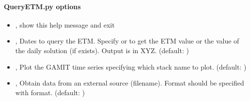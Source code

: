 \documentclass[letterpaper,10pt,english]{sphinxmanual}
\begin{document}
\paragraph{QueryETM.py options}
\label{\detokenize{com:QueryETM.py-options}}\begin{itemize}
\item {} 
\sphinxAtStartPar
{\hyperref[\detokenize{com:QueryETM.py--h}]{}}, {\hyperref[\detokenize{com:QueryETM.py---help}]{}} \sphinxhyphen{} show this help message and exit

\item {} 
\sphinxAtStartPar
{\hyperref[\detokenize{com:QueryETM.py--q}]{}} , {\hyperref[\detokenize{com:QueryETM.py---query}]{}}  \sphinxhyphen{} Dates to query the ETM. Specify  or  to get the ETM value or the value of the daily solution (if exists). Output is in XYZ. (default: )

\item {} 
\sphinxAtStartPar
{\hyperref[\detokenize{com:QueryETM.py--gamit}]{}} , {\hyperref[\detokenize{com:QueryETM.py---gamit}]{}}  \sphinxhyphen{} Plot the GAMIT time series specifying which stack name to plot. (default: )

\item {} 
\sphinxAtStartPar
{\hyperref[\detokenize{com:QueryETM.py--file}]{}} , {\hyperref[\detokenize{com:QueryETM.py---filename}]{}}  \sphinxhyphen{} Obtain data from an external source (filename). Format should be specified with \sphinxhyphen{}format. (default: )


\end{itemize}
\end{document}
